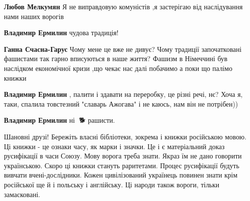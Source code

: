 \textbf{Любов Мелкумян} Я не виправдовую комуністів ,я застерігаю від наслідування нами наших ворогів

 
\textbf{Владимир Ермилин} чудова традиція!

 
\textbf{Ганна Счасна-Гарус} Чому мене це вже не дивує? Чому традиції започатковані фашистами так гарно вписуються в наше життя? Фашизм в Німеччині був наслідком економічної кризи ,що чекає нас далі побачимо а поки що палімо книжки

 
\textbf{Владимир Ермилин} , палити і здавати на переробку, це різні речі, нє?
Хоча я, таки, спалила товстезний "славарь Ажогава" і не каюсь, нам він не потрібен))

 
\textbf{Владимир Ермилин} ні 🐖🐕 рашисти.

 

Шановні друзі! Бережіть власні бібліотеки, зокрема і книжки російською мовою.
Ці книжки - це ознаки часу, як марки і значки. Це і є матеріальний доказ
русифікації в часи Союзу. Мову ворога треба знати. Якраз їм не дано говорити
українською. Скоро ці книжки стануть раритетами. Процес русифікації будуть
вивчати вчені-дослідники. Кожен цивілізований українець повинен знати крім
російської ще й і польську і англійську. Ці народи також вороги, тільки
замасковані.

